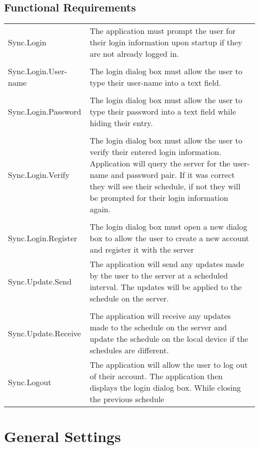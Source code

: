 \documentclass{scrreprt}
\begin{document}
\subsection{Functional Requirements}
\begin{center}
    \begin{longtable}{ | p{6cm} | p{9cm} | }
    \hline
    Sync.Login & The application must prompt the user for their login information
    upon startup if they are not already logged in.\\
    & \\
    Sync.Login.User-name & The login dialog box must allow the user to type their
    user-name into a text field.\\
    & \\
    Sync.Login.Password & The login dialog box must allow the user to type their
    password into a text field while hiding their entry.\\
    & \\
    Sync.Login.Verify & The login dialog box must allow the user to verify their
    entered login information. Application will query the server for the
    user-name and password pair. If it was correct they will see their schedule,
    if not they will be prompted for their login information again.\\
    & \\
    Sync.Login.Register & The login dialog box must open a new dialog box to allow the
    user to create a new account and register it with the server\\
    \hline
    Sync.Update.Send & The application will send any updates made by the user to the
    server at a scheduled interval. The updates will be applied to the schedule on the server.\\
    & \\
    Sync.Update.Receive & The application will receive any updates made to the schedule
    on the server and update the schedule on the local device if the schedules are different.\\
    \hline
    Sync.Logout & The application will allow the user to log out of their account. The
    application then displays the login dialog box. While closing the previous schedule\\
    \hline
    \end{longtable}
\end{center}

\section{General Settings}
\end{document}
